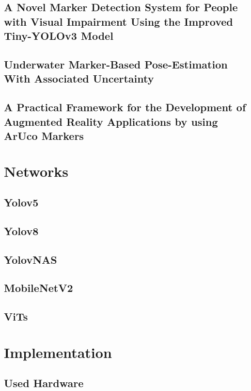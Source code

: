 \documentclass[10pt]{book}
\begin{document}
\section{A Novel Marker Detection System for People with Visual Impairment Using the Improved Tiny-YOLOv3 Model}

\section{Underwater Marker-Based Pose-Estimation With Associated Uncertainty}

\section{A Practical Framework for the Development of Augmented Reality
Applications by using ArUco Markers}

\chapter{Networks}
\label{chap:netw}

\section{Yolov5}

\section{Yolov8}

\section{YolovNAS}

\section{MobileNetV2}

\section{ViTs}

\chapter{Implementation}
\label{chap:implement}

\section{Used Hardware}
\end{document}
